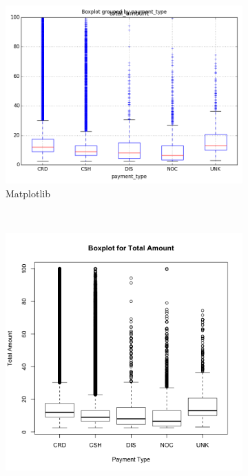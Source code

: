 \documentclass[]{article}
\begin{document}
\begin{figure}
        \centering
        \begin{subfigure}[b]{0.3\textwidth}
                \includegraphics[width=\textwidth]{matplotlib/boxplot.png}
                \caption{Matplotlib}
        \end{subfigure}%
        ~ %
        \begin{subfigure}[b]{0.3\textwidth}
                \includegraphics[width=\textwidth]{R/boxplot.png}

\end{subfigure}
\end{figure}
\end{document}
